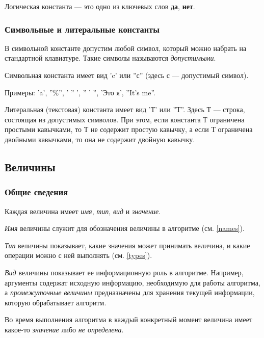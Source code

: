 \documentclass[12pt,a4paper]{article}
\begin{document}
	Логическая константа --- это одно из ключевых слов \textbf{да}, \textbf{нет}.

\subsubsection{Символьные и литеральные константы}

	В символьной константе допустим любой символ, который можно набрать на стандартной клавиатуре. Такие символы называются \emph{допустимыми}.

	Символьная константа имеет вид \textsf{'c'} или \textsf{''с''} (здесь \textsf{с} --- допустимый символ).

	Примеры: \textsf{'a'}, \textsf{''\%''}, \textsf{' '' '}, \textsf{'' ' ''}, \textsf{'Это я'}, \textsf{''It's me''}.
 
	Литеральная (текстовая) константа имеет вид \textsf{'Т'} или \textsf{''Т''}. Здесь \textsf{Т} --- строка,	состоящая из допустимых символов. При этом, если константа \textsf{Т} ограничена простыми кавычками, то \textsf{Т} не содержит простую кавычку, а если \textsf{Т} ограничена двойными кавычками, то она не содержит двойную кавычку.

\subsection{Величины}

\subsubsection{Общие сведения}
\label{velocities}

	Каждая величина имеет \emph{имя}, \emph{тип}, \emph{вид} и \emph{значение}.

	\emph{Имя} величины служит для обозначения величины в алгоритме (см. \ref{names}).

	\emph{Тип} величины показывает, какие значения может принимать величина, и какие операции можно с ней выполнять (см. \ref{types}).

	\emph{Вид} величины показывает ее информационную роль в алгоритме. Например, аргументы содержат исходную информацию, необходимую для работы алгоритма, а \emph{промежуточные величины} предназначены для хранения текущей информации, которую обрабатывает алгоритм. 

	Во время выполнения алгоритма в каждый конкретный момент величина имеет какое-то \emph{значение} либо \emph{не определена}.
\end{document}
